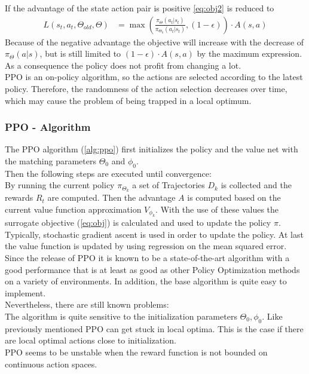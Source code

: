 If the advantage of the state action pair is positive \cref{eq:obj2} is reduced to 
\begin{align}
	L(s_t, a_t, \Theta_{old}, \Theta) &= \max (\frac{\pi_{\Theta}(a_t|s_t)}{\pi_{\Theta_k}(a_t|s_t)}, (1 - \epsilon)) \cdot A(s,a)
\end{align}
Because of the negative advantage the objective will increase with the decrease of $\pi_{\Theta} (a|s)$, 
but is still limited to $(1 - \epsilon) \cdot A(s,a)$ by the maximum expression.\\
As a consequence the policy does not profit from changing a lot.\\
PPO is an on-policy algorithm, so the actions are selected according to the latest policy. 
Therefore, the randomness of the action selection decreases over time, which may cause the problem of being trapped in a local optimum.

\newpage
\subsubsection{PPO - Algorithm}
The PPO algorithm (\cref{alg:ppo}) first initializes the policy and the value net with the matching parameters $\Theta_0$ and $\phi_0$.\\
Then the following steps are executed until convergence:\\
By running the current policy $\pi_{\Theta_k}$ a set of Trajectories $D_k$ is collected and the rewards $R_t$ are computed. 
Then the advantage $A$ is computed based on the current value function approximation $V_{\phi_k}$. 
With the use of these values the surrogate objective (\cref{eq:obj}) is calculated and used to update the policy $\pi$. 
Typically, stochastic gradient ascent is used in order to update the policy. At last the value function is updated by using regression on the mean squared error.\\
\newline
Since the release of PPO it is known to be a state-of-the-art algorithm with a good performance that is at least as good as other 
Policy Optimization methods on a variety of environments. In addition, the base algorithm is quite easy to implement.\\
Nevertheless, there are still known problems:\\
The algorithm is quite sensitive to the initialization parameters $\Theta_0, \phi_0$. Like previously mentioned PPO can get stuck in local optima. 
This is the case if there are local optimal actions close to initialization.\\
PPO seems to be unstable when the reward function is not bounded on continuous action spaces. 

